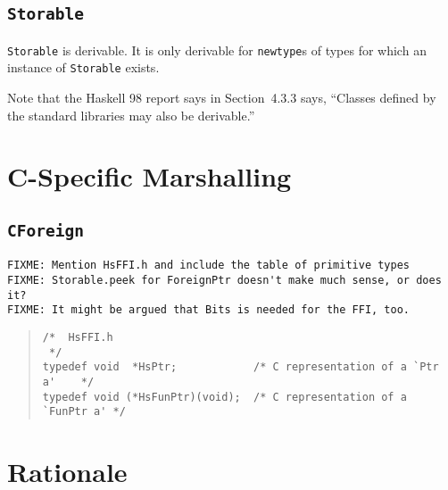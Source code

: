 \documentclass[a4paper,twosides]{article}
\newcommand{\code}[1]{\texttt{#1}}      %
\begin{document}
\subsection{\code{Storable}}
\label{sec:Storable}

\code{Storable} is derivable.  It is only derivable for \code{newtype}s of
types for which an instance of \code{Storable} exists.


Note that the Haskell 98 report says in Section~4.3.3 says, ``Classes defined
by the standard libraries may also be derivable.''


\newpage
\section{C-Specific Marshalling}
\label{sec:c-marshalling}

\subsection{\code{CForeign}}

\begin{verbatim}
FIXME: Mention HsFFI.h and include the table of primitive types
FIXME: Storable.peek for ForeignPtr doesn't make much sense, or does it?
FIXME: It might be argued that Bits is needed for the FFI, too.
\end{verbatim}

\begin{quote}
\begin{verbatim}
/*  HsFFI.h
 */
typedef void  *HsPtr;            /* C representation of a `Ptr a'    */
typedef void (*HsFunPtr)(void);  /* C representation of a `FunPtr a' */
\end{verbatim}
\end{quote}


\appendix
\newpage
\section{Rationale}
\end{document}
